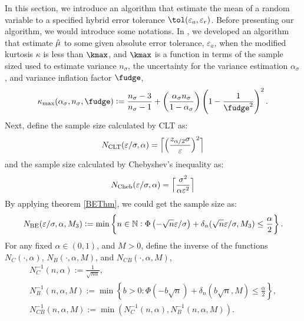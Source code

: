 \documentclass{iitthesis}
\begin{document}
In this section, we introduce an algorithm that estimate the mean of a random variable to a specified hybrid error tolerance $\tol(\varepsilon_a, \varepsilon_r)$. Before presenting our algorithm, we would introduce some notations. In \cite{HJLO12}, we developed an algorithm that estimate $\hat{\mu}$ to some given absolute error tolerance, $\varepsilon_a$, when the modified kurtosis $\kappa$ is less than $\kmax$, and $\kmax$ is a function in terms of the sample sized used to estimate variance $n_\sigma$, the uncertainty for the variance estimation $\alpha_\sigma$, and variance inflation factor $\fudge$,
\begin{equation}
\label{kappamaxdef}
\kappa_{\max} (\alpha_\sigma, n_{\sigma},\fudge):= \frac{n_{\sigma}-3}{n_{\sigma}-1} + \left(\frac{ \alpha_\sigma n_{\sigma}}{1-\alpha_\sigma}\right) \left(1 - \frac{1}{\fudge^2}\right)^2.
\end{equation}
Next, define the sample size calculated by CLT as:
\begin{equation}\label{NCLT}
N_{\mathrm{CLT}}(\varepsilon/\sigma,\alpha)
= 
\Bigl\lceil
\Bigl(
\frac{z_{\alpha/2}\sigma}{\varepsilon}
\Bigr)^2
\Bigr\rceil
\end{equation}
and the sample size calculated by Chebyshev's inequality as:
\begin{equation}\label{NCheby}
N_{\text{Cheb}}(\varepsilon/\sigma,\alpha)
= 
\Bigl\lceil\frac{\sigma^2}{\alpha\varepsilon^2}\Bigr\rceil
\end{equation}
By applying theorem \ref{BEThm}, we could get the sample size as:
\begin{equation}\label{NBE}
N_{\text{BE}}(\varepsilon/\sigma,\alpha,M_3) := \min \left \{ n \in \mathbb{N} : \Phi\left(-\sqrt{n}\varepsilon/\sigma  \right)+\delta_n(\sqrt{n}\varepsilon/\sigma,M_3)
\le \frac{\alpha}{2} \right \}.
\end{equation}
For any fixed $\alpha \in (0,1)$, and $M>0$, define the inverse of the functions $N_C(\cdot,\alpha)$, $N_B(\cdot,\alpha,M)$, and $N_{CB}(\cdot,\alpha,M)$,
\begin{gather*}\label{NCinv}
N_C^{-1}(n,\alpha) := \frac{1}{\sqrt{n \alpha}}, \\
\label{NBinv*}
N_B^{-1}(n,\alpha,M) := \min \left \{ b>0 : \Phi\left(-b \sqrt{n}  \right)+\delta_n(b\sqrt{n},M)
\le \frac{\alpha}{2} \right \}, \\
\label{NCBinv*}
N_{CB}^{-1}(n,\alpha,M) := \min(N_C^{-1}(n,\alpha),N_B^{-1}(n,\alpha,M)).
\end{gather*}
\end{document}
